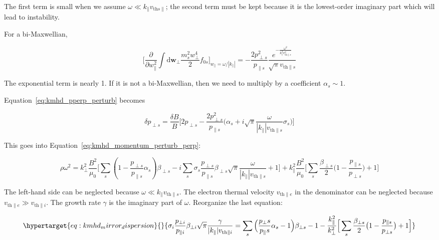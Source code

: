 \documentclass[
  notoc %
]{tufte-book}
\begin{document}
The first term is small when we assume
\(\omega\ll k_\parallel v_{\text{th}s\parallel}\); the second term must
be kept because it is the lowest-order imaginary part which will lead to
instability.

For a bi-Maxwellian,

\[
\Big[ \frac{\partial}{\partial w_\parallel^2}\int \mathrm{d}\mathbf{w}_\perp\frac{m_s^2w_\perp^4}{2}f_{0s} \Big]_{w_\parallel=\omega/|k_\parallel|} = -\frac{2p_{\perp s}^2}{p_{\parallel s}}\frac{e^{-\frac{\omega^2}{k_\parallel^2 v_{\text{th}\parallel s}^2}}}{\sqrt{\pi}v_{\text{th}\parallel s}}
\]

The exponential term is nearly 1. If it is not a bi-Maxwellian, then we
need to multiply by a coefficient \(\alpha_s \sim 1\).

Equation~\ref{eq:kmhd_pperp_perturb} becomes

\[
\delta p_{\perp s} = \frac{\delta B}{B}\Big[ 2p_{\perp s} - \frac{2p_{\perp s}^2}{p_{\parallel s}}\Big( \alpha_s + i\sqrt{\pi}\frac{\omega}{|k_\parallel|v_{\text{th}\parallel s}}\sigma_s \Big) \Big]
\]

This goes into Equation~\ref{eq:kmhd_momentum_perturb_perp}:

\[
\rho \omega^2 = k_\perp^2\frac{B^2}{\mu_0}\Big[ \sum_s(1 - \frac{p_{\perp s}}{p_{\parallel s}}\alpha_s)\beta_{\perp s} - i\sum_s \sigma_s\frac{p_{\perp s}}{p_{\parallel s}}\beta_{\perp s}\sqrt{\pi}\frac{\omega}{|k_\parallel| v_{\text{th} \parallel s}} + 1 \Big] + k_\parallel^2 \frac{B^2}{\mu_0}\Big[ \sum_s\frac{\beta_{\perp s}}{2}\big( 1 - \frac{p_{\parallel s}}{p_{\perp s}} \big) + 1 \Big]
\]

The left-hand side can be neglected because
\(\omega\ll k_\parallel v_{\text{th}\parallel s}\). The electron thermal
velocity \(v_{\text{th}\parallel e}\) in the denominator can be
neglected because
\(v_{\text{th}\parallel e} \gg v_{\text{th}\parallel i}\). The growth
rate \(\gamma\) is the imaginary part of \(\omega\). Reorganize the last
equation:

\begin{equation}\protect\hypertarget{eq:kmhd_mirror_dispersion}{}{
\sigma_i\frac{p_{\perp i}}{p_{\parallel i}}\beta_{\perp i}\sqrt{\pi}\frac{\gamma}{|k_\parallel|v_{\text{th}\parallel i}} = \sum_s \Big(\frac{p_\perp s}{p_\parallel s}\alpha_s - 1 \Big)\beta_{\perp s} - 1 -\frac{k_\parallel^2}{k_\perp^2}\Big[ \sum_s\frac{\beta_{\perp s}}{2}\big( 1-\frac{p_{\parallel s}}{p_{\perp s}}\big) + 1 \Big]
}\label{eq:kmhd_mirror_dispersion}\end{equation}
\end{document}
